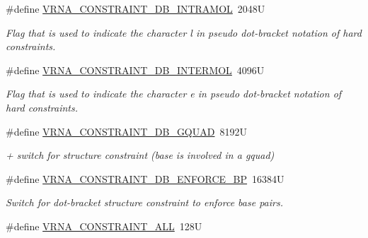 \begin{DoxyCompactItemize}
\#define \hyperlink{group__constraints_ga5c17253f5a39d1d49b0fb11f5196982a}{V\+R\+N\+A\+\_\+\+C\+O\+N\+S\+T\+R\+A\+I\+N\+T\+\_\+\+D\+B\+\_\+\+I\+N\+T\+R\+A\+M\+O\+L}~2048\+U
\begin{DoxyCompactList}\small\item\em Flag that is used to indicate the character \textquotesingle{}l\textquotesingle{} in pseudo dot-\/bracket notation of hard constraints. \end{DoxyCompactList}\item 
\#define \hyperlink{group__constraints_ga31d0ebb9755ca8a4acafc14f00ca755d}{V\+R\+N\+A\+\_\+\+C\+O\+N\+S\+T\+R\+A\+I\+N\+T\+\_\+\+D\+B\+\_\+\+I\+N\+T\+E\+R\+M\+O\+L}~4096\+U
\begin{DoxyCompactList}\small\item\em Flag that is used to indicate the character \textquotesingle{}e\textquotesingle{} in pseudo dot-\/bracket notation of hard constraints. \end{DoxyCompactList}\item 
\#define \hyperlink{group__constraints_ga75cfab03cdc97c95b3ce8bb29f52b08e}{V\+R\+N\+A\+\_\+\+C\+O\+N\+S\+T\+R\+A\+I\+N\+T\+\_\+\+D\+B\+\_\+\+G\+Q\+U\+A\+D}~8192\+U
\begin{DoxyCompactList}\small\item\em \textquotesingle{}+\textquotesingle{} switch for structure constraint (base is involved in a gquad) \end{DoxyCompactList}\item 
\#define \hyperlink{group__constraints_ga29ebe940110d60ab798fdacbcdbbfb7d}{V\+R\+N\+A\+\_\+\+C\+O\+N\+S\+T\+R\+A\+I\+N\+T\+\_\+\+D\+B\+\_\+\+E\+N\+F\+O\+R\+C\+E\+\_\+\+B\+P}~16384\+U
\begin{DoxyCompactList}\small\item\em Switch for dot-\/bracket structure constraint to enforce base pairs. \end{DoxyCompactList}\item 
\hypertarget{group__constraints_ga0a697f77a6fbb10f34e16fa68ed9e655}{}\#define \hyperlink{group__constraints_ga0a697f77a6fbb10f34e16fa68ed9e655}{V\+R\+N\+A\+\_\+\+C\+O\+N\+S\+T\+R\+A\+I\+N\+T\+\_\+\+A\+L\+L}~128\+U\label{group__constraints_ga0a697f77a6fbb10f34e16fa68ed9e655}


\end{DoxyCompactItemize}
